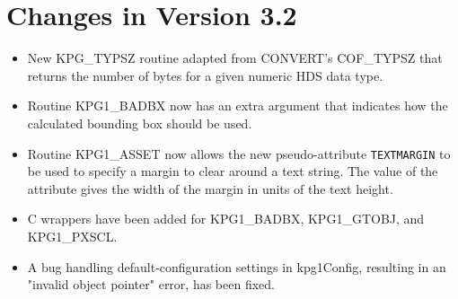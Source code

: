 \section{Changes in Version 3.2}
\begin{itemize}
\item New KPG\_TYPSZ routine adapted from CONVERT's COF\_TYPSZ that
      returns the number of bytes for a given numeric HDS data type.
\item Routine KPG1\_BADBX now has an extra argument that indicates how the
      calculated bounding box should be used.
\item Routine KPG1\_ASSET now allows the new pseudo-attribute {\tt TEXTMARGIN}
      to be used to specify a margin to clear around a text string. The
      value of the attribute gives the width of the margin in units of the
      text height.
\item C wrappers have been added for KPG1\_BADBX, KPG1\_GTOBJ, and KPG1\_PXSCL.
\item A bug handling default-configuration settings in kpg1Config, resulting in
      an "invalid object pointer" error, has been fixed.

\end{itemize}

